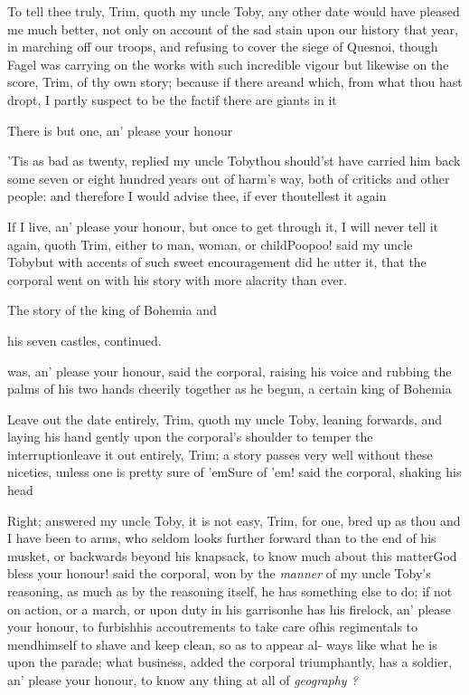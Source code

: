 \documentclass{article}
\begin{document}
\tsh To tell thee truly, Trim, quoth\break
my uncle Toby, any other date would\break
have pleased me much better, not only\break
on account of the sad stain upon our\break
history that year, in marching off our\break
troops, and refusing to cover the siege of\break
Quesnoi, though Fagel was carrying on\break
the works with such incredible vigour\tsk\break
but likewise on the score, Trim, of thy\break
own story; because if there are\tsk and\break
which, from what thou hast dropt, I 
partly suspect to be the
fact\tsk if there are giants in it\tsh

There is but one, an’ please your honour\tsh

\tsh ’Tis as bad as twenty, replied my uncle
Toby\tsh thou should’st have carried him back
some seven or eight hundred years out of harm’s way, both of
criticks and other people: and therefore I would advise thee, if
ever thou\break tellest it again\tsh

\tsh If I live, an’ please your honour, but once
to get through it, I will never tell it again, quoth Trim,
either to man, woman, or child\tsh Poo\tsk poo! said my uncle Toby\tsk but with accents of
such sweet encouragement did he utter it, that the corporal went on
with his story with more alacrity than ever.

\bigskip
\centerline{The story of the king of Bohemia and}
\centerline{his seven castles, continued.}

 was, an’ please your
honour, said the corporal, raising his voice and rubbing the palms
of his two hands cheerily together as he
begun,\break
a certain king of Bohemia\tsh

\tsh Leave out the date entirely, Trim, quoth my
uncle Toby, leaning forwards, and laying his hand gently
upon the corporal’s shoulder to temper the
interruption\tsk leave it out entirely, Trim; a story
passes very well without these niceties, unless one is pretty sure
of ’em\tsh Sure of ’em! said the corporal,
shaking his head\tsh

Right; answered my uncle Toby, it is not easy,
Trim, for one, bred up as thou and I have been to arms, who
seldom looks further forward than to the end of his
musket, or backwards beyond his knapsack,
to know much about this\break
matter\tsh God bless your honour! said the corporal, won
by the \textit{manner} of my uncle Toby’s reasoning, as much as
by the reasoning itself, he has something else to do; if not on
action, or a march, or upon duty in his garrison\tsk he has his
firelock, an’ please your honour, to furbish\tsk his
accoutrements to take care of\tsk his regimentals to
mend\tsk himself to shave and keep clean, so as to appear al- ways
like what he is upon the parade; what business, added the corporal
triumphantly, has a soldier, an’ please your honour, to know
any thing at all of \textit{geo\-graphy ?}
\end{document}
